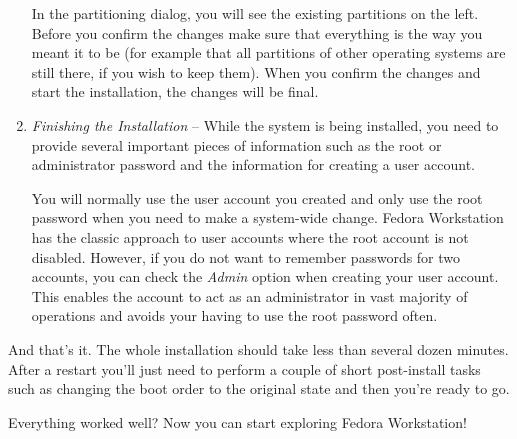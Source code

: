 \begin{enumerate}
In the partitioning dialog, you will see the existing partitions on the left. Before you confirm the changes make sure that everything is the way you meant it to be (for example that all partitions of other operating systems are still there, if you wish to keep them). When you confirm the changes and start the installation, the changes will be final.

\item\emph{Finishing the Installation} -- While the system is being installed, you need to provide several important pieces of information such as the root or administrator password and the information for creating a user account.

You will normally use the user account you created and only use the root password when you need to make a system-wide change. Fedora Workstation has the classic approach to user accounts where the root account is not disabled. However, if you do not want to remember passwords for two accounts, you can check the \emph{Admin} option when creating your user account. This enables the account to act as an administrator in vast majority of operations and avoids your having to use the root password often.
\end{enumerate}

And that's it. The whole installation should take less than several dozen minutes. After a restart you'll just need to perform a couple of short post-install tasks such as changing the boot order to the original state and then you're ready to go.

Everything worked well? Now you can start exploring Fedora Workstation!

\endinput
